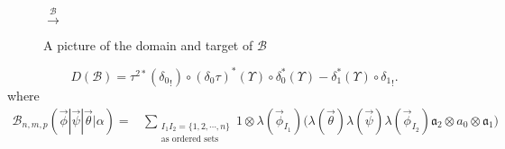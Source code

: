 \begin{figure} \label{fig:upsilon}
\centerline{
$\overset{\mathcal{B}}\longrightarrow$
}
\caption{A picture of the domain and target of $\mathcal{B}$}
\end{figure}


\begin{prop}
\begin{equation} \label{eq:prop4}
D(\mathcal{B}) = \tau^{2*}({\delta_0}_!) \circ (\delta_0 \tau)^*(\Upsilon) \circ \delta_0^*(\Upsilon) 
   - \delta_1^*(\Upsilon) \circ {\delta_1}_!.
\end{equation} where
\begin{align*}
\mathcal{B}_{n, m, p} (\vec{\phi} | \vec{\psi} | \vec{\theta} | \alpha) 
= & \sum_{\substack{I_1I_2 = \{1,2,\cdots,n\} \\
                          \textrm{as ordered sets}}}
  1 \otimes \lambda(\vec{\phi}_{I_1})\big( \lambda(\vec{\theta}) \lambda(\vec{\psi}) \lambda(\vec{\phi}_{I_2})
  \mathfrak{a}_2 \otimes a_0 \otimes \mathfrak{a}_1 \big)                          
\end{align*}
\end{prop}


